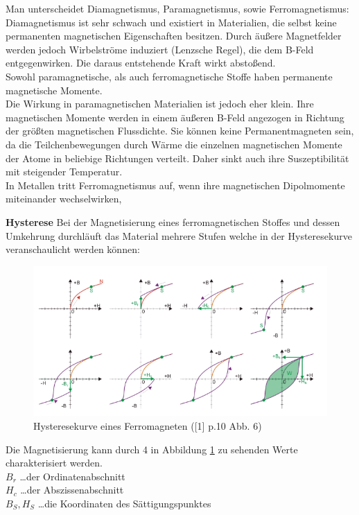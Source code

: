 \documentclass[12pt,a4paper]{article}
\begin{document}
\begin{multicols}{2}
Man unterscheidet Diamagnetismus, Paramagnetismus, sowie Ferromagnetismus:\\
Diamagnetismus ist sehr schwach und existiert in Materialien, die selbst keine permanenten magnetischen Eigenschaften besitzen. Durch äußere Magnetfelder werden jedoch Wirbelströme induziert (Lenzsche Regel), die dem B-Feld entgegenwirken. Die daraus entstehende Kraft wirkt abstoßend.\\

Sowohl paramagnetische, als auch ferromagnetische Stoffe haben permanente magnetische Momente.\\
Die Wirkung in paramagnetischen Materialien ist jedoch eher klein. Ihre magnetischen Momente werden in einem äußeren B-Feld angezogen in Richtung der größten magnetischen Flussdichte. Sie können keine Permanentmagneten sein, da die Teilchenbewegungen durch Wärme die einzelnen magnetischen Momente der Atome in beliebige Richtungen verteilt. Daher sinkt auch ihre Suszeptibilität mit steigender Temperatur.\\

In Metallen tritt Ferromagnetismus auf, wenn ihre magnetischen Dipolmomente miteinander wechselwirken, 



\textbf{Hysterese}
Bei der Magnetisierung eines ferromagnetischen Stoffes und dessen Umkehrung durchläuft das Material mehrere Stufen welche in der Hysteresekurve veranschaulicht werden können:

\begin{figure}[H]
	\centering
	\includegraphics[scale=0.3]{./figures/hysterese.png}
	\caption{Hysteresekurve eines Ferromagneten ([1] p.10 Abb. 6)}
	\label{fig:hysterese}
\end{figure}

\noindent
Die Magnetisierung kann durch 4 in Abbildung \ref{fig:hysterese} zu sehenden Werte charakterisiert werden.\\
$B_r$ \ldots der Ordinatenabschnitt\\
$H_c$ \ldots der Abszissenabschnitt\\
$B_S, H_S$ \ldots die Koordinaten des Sättigungspunktes\\


\end{multicols}
\end{document}

